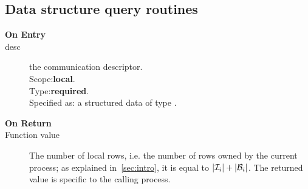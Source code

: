 

\subsection{Data structure query routines}
\label{sec:dataquery}


\begin{description}
\item[\bf On Entry]
\item[desc] the communication descriptor.\\
Scope:{\bf local}.\\
Type:{\bf required}.\\
Specified as: a structured data of type \descdata.
\end{description}

\begin{description}
\item[\bf On Return]
\item[Function value] The number of local rows, i.e. the number of
  rows owned by the current process; as explained in~\ref{sec:intro},
  it is equal to $|{\cal I}_i| + |{\cal B}_i|$. The returned value is
  specific to the calling process. 
\end{description}



